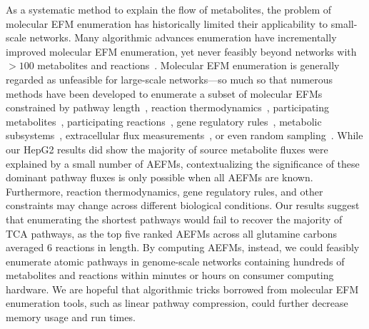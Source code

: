 \documentclass[12pt]{article}
\begin{document}
As a systematic method to explain the flow of metabolites, the problem of
molecular EFM enumeration has historically limited their applicability to
small-scale networks. Many algorithmic advances enumeration have
incrementally improved molecular EFM enumeration, yet never feasibly
beyond networks with $>100$ metabolites and
reactions~\citep{KampAxelvon2006M5fa,TerzerMarco2008Lcoe,vanKlinkenJanBert2016Faet}.
Molecular EFM enumeration is generally regarded as unfeasible for
large-scale networks---so much so that numerous methods have been
developed to enumerate a subset of molecular EFMs constrained by pathway
length~\citep{deFigueiredoLuisF2009Ctse}, reaction
thermodynamics~\citep{GerstlMatthiasP2015Mief}, participating
metabolites~\citep{PeyJon2014Dcoe}, participating
reactions~\citep{KaletaChristoph2009Ctwb}, gene regulatory
rules~\citep{JungreuthmayerChristian2013rSue}, metabolic
subsystems~\citep{SchusterS2002Etps,SchwartzJean-Marc2007Omfa},
extracellular flux
measurements~\citep{SoonsZitaITA2011Iomm,JungersRaphaelM.2011Fcom}, or
even random sampling~\citep{MachadoDaniel2012Rsoe}. While our HepG2
results did show the majority of source metabolite fluxes were explained
by a small number of AEFMs, contextualizing the significance of these
dominant pathway fluxes is only possible when all AEFMs are known.
Furthermore, reaction thermodynamics, gene regulatory rules, and other
constraints may change across different biological conditions. Our results
suggest that enumerating the shortest pathways would fail to recover the
majority of TCA pathways, as the top five ranked AEFMs across all
glutamine carbons averaged 6 reactions in length. By computing AEFMs,
instead, we could feasibly enumerate atomic pathways in genome-scale
networks containing hundreds of metabolites and reactions within minutes
or hours on consumer computing hardware. We are hopeful that algorithmic
tricks borrowed from molecular EFM enumeration tools, such as linear
pathway compression, could further decrease memory usage and run times.
\end{document}
